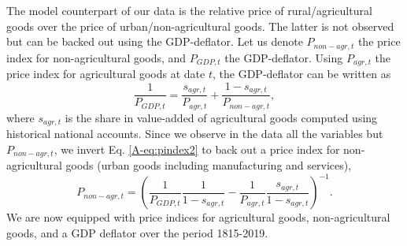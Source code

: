 \documentclass[11pt]{report}
\begin{document}

The model counterpart of our data is the relative price of rural/agricultural goods over the price of urban/non-agricultural goods. The latter is not observed but can be backed out using the GDP-deflator. 
Let us denote $P_{non-agr,t}$ the price index for non-agricultural goods, and $P_{GDP,t}$ the GDP-deflator. Using $P_{agr,t}$ the price index for agricultural goods at date $t$, the GDP-deflator can be written as 
\begin{equation}
	\frac{1}{P_{GDP,t}}=\frac{s_{agr,t}}{P_{agr,t}}+\frac{1-s_{agr,t}}{P_{non-agr,t}}, \label{A-eq:pindex2}
\end{equation}
where $s_{agr,t}$ is the share in value-added of agricultural goods computed using historical national accounts. Since we observe in the data all the variables but $P_{non-agr,t}$, we invert Eq. \ref{A-eq:pindex2} to back out a price index for non-agricultural goods (urban goods including manufacturing and services),
\begin{equation*}
	P_{non-agr,t}=\left(\frac{1}{P_{GDP,t}}\frac{1}{1-s_{agr,t}}-\frac{1}{P_{agr,t}}\frac{s_{agr,t}}{1-s_{agr,t}}\right)^{-1}.
\end{equation*}
We are now equipped with price indices for agricultural goods, non-agricultural goods, and a GDP deflator over the period 1815-2019.
\end{document}
